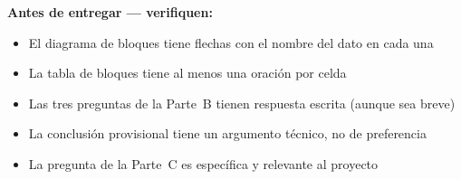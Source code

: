 \documentclass[11pt, letterpaper]{article}
\begin{document}
\vspace{1cm}

\begin{mdframed}[backgroundcolor=amberLight, linecolor=amberMain, linewidth=1pt,
  innerleftmargin=12pt, innerrightmargin=12pt,
  innertopmargin=8pt,  innerbottommargin=8pt]
  \textbf{\color{amberMain}Antes de entregar --- verifiquen:}
  \begin{itemize}[leftmargin=1.5cm, label=$\boxtimes$, itemsep=2pt]
    \item El diagrama de bloques tiene flechas con el nombre del dato en cada una
    \item La tabla de bloques tiene al menos una oraci\'on por celda
    \item Las tres preguntas de la Parte~B tienen respuesta escrita (aunque sea breve)
    \item La conclusi\'on provisional tiene un argumento t\'ecnico, no de preferencia
    \item La pregunta de la Parte~C es espec\'ifica y relevante al proyecto
  \end{itemize}
\end{mdframed}
\end{document}
